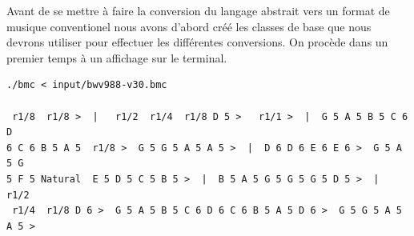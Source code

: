 Avant de se mettre à faire la conversion du langage abstrait vers un format de musique conventionel nous avons d'abord créé les classes de base que nous devrons utiliser pour effectuer les différentes conversions. On procède dans un premier temps à un affichage sur le terminal.

\begin{verbatim}
./bmc < input/bwv988-v30.bmc 

 r1/8  r1/8 >  |   r1/2  r1/4  r1/8 D 5 >   r1/1 >  |  G 5 A 5 B 5 C 6 D 
6 C 6 B 5 A 5  r1/8 >  G 5 G 5 A 5 A 5 >  |  D 6 D 6 E 6 E 6 >  G 5 A 5 G 
5 F 5 Natural  E 5 D 5 C 5 B 5 >  |  B 5 A 5 G 5 G 5 G 5 D 5 >  |   r1/2 
 r1/4  r1/8 D 6 >  G 5 A 5 B 5 C 6 D 6 C 6 B 5 A 5 D 6 >  G 5 G 5 A 5 A 5 > 
\end{verbatim}

